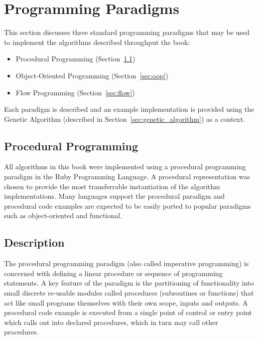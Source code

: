 
\section{Programming Paradigms} 
\label{advanced:sec:paradigms}

This section discusses three standard programming paradigms that may be used to implement the algorithms described throughput the book:

\begin{itemize}
	\item Procedural Programming (Section~\ref{sec:procedural})
	\item Object-Oriented Programming (Section~\ref{sec:oop})
	\item Flow Programming (Section~\ref{sec:flow})
\end{itemize}

Each paradigm is described and an example implementation is provided using the Genetic Algorithm (described in Section~\ref{sec:genetic_algorithm}) as a context.

% 
% 
\subsection{Procedural Programming}
\label{sec:procedural}
All algorithms in this book were implemented using a procedural programming paradigm in the Ruby Programming Language. A procedural representation was chosen to provide the most transferrable instantiation of the algorithm implementations. Many languages support the procedural paradigm and procedural code examples are expected to be easily ported to popular paradigms such as object-oriented and functional.

\subsection{Description}
The procedural programming paradigm (also called imperative programming) is concerned with defining a linear procedure or sequence of programming statements. A key feature of the paradigm is the partitioning of functionality into small discrete re-usable modules called procedures (subroutines or functions) that act like small programs themselves with their own scope, inputs and outputs. A procedural code example is executed from a single point of control or entry point which calls out into declared procedures, which in turn may call other procedures.

